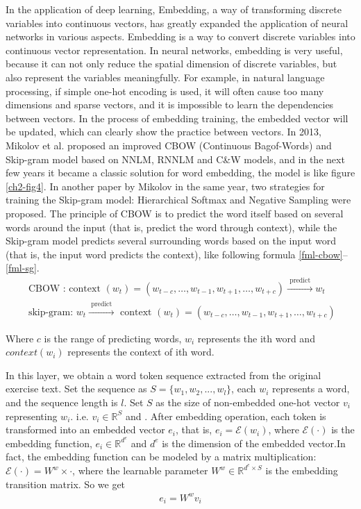 In the application of deep learning, Embedding, a way of transforming discrete variables into continuous vectors, has greatly expanded the application of neural networks in various aspects. Embedding is a way to convert discrete variables into continuous vector representation. In neural networks, embedding is very useful, because it can not only reduce the spatial dimension of discrete variables, but also represent the variables meaningfully. For example, in natural language processing, if simple one-hot encoding is used, it will often cause too many dimensions and sparse vectors, and it is impossible to learn the dependencies between vectors. In the process of embedding training, the embedded vector will be updated, which can clearly show the practice between vectors. In 2013, Mikolov et al. proposed an improved CBOW (Continuous Bagof-Words) and Skip-gram model based on NNLM, RNNLM and C&W models\cite{mikolov2013efficient}, and in the next few years it became a classic solution for word embedding, the model is like figure \ref{ch2-fig4}. In another paper by Mikolov in the same year, two strategies for training the Skip-gram model: Hierarchical Softmax and Negative Sampling were proposed\cite{mikolov2013distributed}. The principle of CBOW is to predict the word itself based on several words around the input (that is, predict the word through context), while the Skip-gram model predicts several surrounding words based on the input word (that is, the input word predicts the context), like following formula \ref{fml-cbow}--\ref{fml-sg}.
\begin{align}
\text { CBOW : context }\left(w_{t}\right)=\left(w_{t-c}, \ldots, w_{t-1}, w_{t+1}, \ldots, w_{t+c}\right) \stackrel{\text { predict }}{\longrightarrow} w_{t} \label{fml-cbow}\\
\text { skip-gram: } w_{t} \stackrel{\text { predict }}{\longrightarrow} \text { context }\left(w_{t}\right)=\left(w_{t-c}, \ldots, w_{t-1}, w_{t+1}, \ldots, w_{t+c}\right) \label{fml-sg}
\end{align}

Where $c$ is the range of predicting words, $w_i$ represents the ith word and $context(w_i)$ represents the context of ith word.

In this layer, we obtain a word token sequence extracted from the original exercise text. Set the sequence as $S=\{w_1,w_2,...,w_l\}$, each $w_i$ represents a word, and the sequence length is $l$. Set $S$ as the size of non-embedded one-hot vector $v_i$ representing $w_i$. i.e. $v_i\in \mathbb{R}^{S}$ and . After embedding operation, each token is transformed into an embedded vector $e_i$, that is, $e_i=\mathcal{E}(w_i)$, where $\mathcal{E}(\cdot)$ is the embedding function, $e_i\in \mathbb{R}^{d^{e}}$ and $d^e$ is the dimension of the embedded vector.In fact, the embedding function can be modeled by a matrix multiplication: $ \mathcal {E} (\cdot) = W^w\times \cdot$, where the learnable parameter $W^w\in \mathbb {R} ^ {d^{e}\times S} $ is the embedding transition matrix. So we get 
\begin{align}
	e_i = W^w v_i 
\end{align}

